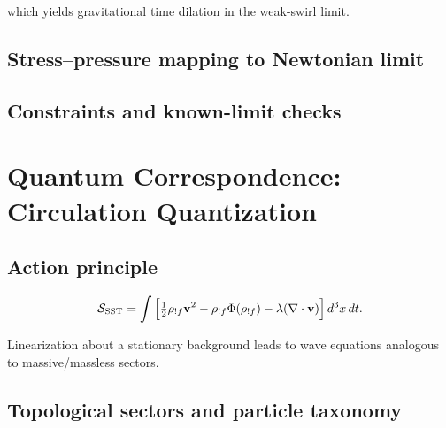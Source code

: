 \documentclass[11pt,a4paper]{article}
\newcommand{\rhoF}{\rho_{!f}}                            %
\begin{document}
which yields gravitational time dilation in the weak-swirl limit.


\subsection{Stress--pressure mapping to Newtonian limit}



\subsection{Constraints and known-limit checks}




\section{Quantum Correspondence: Circulation Quantization}

\label{sec:quantum}


\subsection{Action principle}

\begin{equation}

\mathcal S_{\rm SST} = \int \Big[ \tfrac{1}{2}\rhoF \mathbf v^2 - \rhoF \Phi(\rhoF) - \lambda (\nabla\cdot\mathbf v) \Big] \, d^3x\, dt.

\end{equation}

Linearization about a stationary background leads to wave equations analogous to massive/massless sectors.


\subsection{Topological sectors and particle taxonomy}



\end{document}
